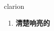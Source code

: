 
\begin{frame}
{\huge clarion}
\begin{center}
\begin{enumerate}\Large
  \item \textbf{清楚响亮的}
\end{enumerate}
\end{center}
\end{frame}
